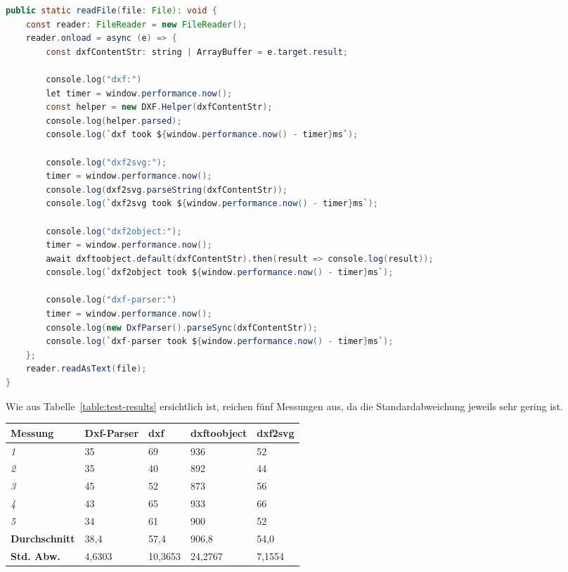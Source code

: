 \begin{lstlisting}[language=Java,breaklines,basicstyle=\ttfamily\scriptsize,label=code:test-code,caption={Testprogramm, welches für jeden Messdurchgang durchgeführt wird. Dient zur Bestimmung der Bibliothekenlaufzeit.}]
public static readFile(file: File): void {
	const reader: FileReader = new FileReader();
	reader.onload = async (e) => {
		const dxfContentStr: string | ArrayBuffer = e.target.result;

		console.log("dxf:")
		let timer = window.performance.now();
		const helper = new DXF.Helper(dxfContentStr);
		console.log(helper.parsed);
		console.log(`dxf took ${window.performance.now() - timer}ms`);

		console.log("dxf2svg:");
		timer = window.performance.now();
		console.log(dxf2svg.parseString(dxfContentStr));
		console.log(`dxf2svg took ${window.performance.now() - timer}ms`);

		console.log("dxf2object:");
		timer = window.performance.now();
		await dxftoobject.default(dxfContentStr).then(result => console.log(result));
		console.log(`dxf2object took ${window.performance.now() - timer}ms`);

		console.log("dxf-parser:")
		timer = window.performance.now();
		console.log(new DxfParser().parseSync(dxfContentStr));
		console.log(`dxf-parser took ${window.performance.now() - timer}ms`);
	};
	reader.readAsText(file);
}
\end{lstlisting}

Wie aus Tabelle~\ref{table:test-results} ersichtlich ist, reichen fünf Messungen aus, da die Standardabweichung jeweils sehr gering ist.

\begin{center}
    \small
    \begin{supertabular}{ p{1.8cm}|p{1.4cm}|p{1cm}|p{1.5cm}|p{1.2cm} }
        \label{table:test-results}
        Messung & \textbf{Dxf-Parser} & \textbf{dxf} & \textbf{dxftoobject} & \textbf{dxf2svg} \\
        \hline
        \textit{1} & 35 & 69 & 936 & 52 \\
        \textit{2} & 35 & 40 & 892 & 44 \\
        \textit{3} & 45 & 52 & 873 & 56 \\
        \textit{4} & 43 & 65 & 933 & 66 \\
        \textit{5} & 34 & 61 & 900 & 52 \\
        \textbf{Durchschnitt} & 38,4 & 57,4 & 906,8 & 54,0 \\
        \textbf{Std. Abw.} & 4,6303 & 10,3653 & 24,2767 & 7,1554 \\
    \end{supertabular}
\end{center}

